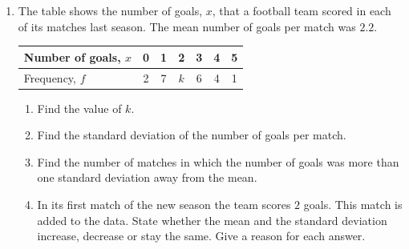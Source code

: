 \documentclass[12pt, twoside]{article}
\begin{document}
\begin{enumerate}[itemsep=0.15cm]
\newpage

\item[2.]

The table shows the number of goals, $x$, that a football team scored in
each of its matches last season. The mean number of goals per match was
$2.2$.

\begin{center}
\setlength{\tabcolsep}{10pt}\renewcommand{\arraystretch}{1.2}
\begin{tabular}{|l|c|c|c|c|c|c|}
\hline
Number of goals, $x$ & 0 & 1 & 2 & 3 & 4 & 5 \\
\hline
Frequency, $f$ & 2 & 7 & $k$ & 6 & 4 & 1 \\
\hline
\end{tabular}
\end{center}

\begin{enumerate}[itemsep=0.1cm]
  \item Find the value of $k$.
  \item Find the standard deviation of the number of goals per match.
  \item Find the number of matches in which the number of goals was more
  than one standard deviation away from the mean.
  \item In its first match of the new season the team scores $2$ goals.
  This match is added to the data. State whether the mean and the
  standard deviation increase, decrease or stay the same. Give a reason
  for each answer.
\end{enumerate}


\end{enumerate}
\end{document}
